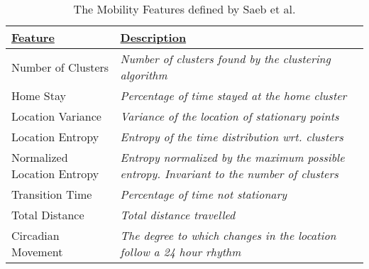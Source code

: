 \begin{table}[h]
    \centering
\begin{tabular}{|p{}|p{}|}
\hline
{\ul \textbf{Feature}}      & {\ul \textbf{Description}}                                                                                                                     \\ \hline
Number of Clusters          & \textit{Number of clusters found by the clustering algorithm}                                       \\ \hline
Home Stay                   & \textit{Percentage of time stayed at the home cluster}                                              \\ \hline
Location Variance           & \textit{Variance of the location of stationary points}                                              \\ \hline
Location Entropy            & \textit{Entropy of the time distribution wrt. clusters}                                             \\ \hline
Normalized Location Entropy & \textit{Entropy normalized by the maximum possible entropy. Invariant to the number of clusters} \\ \hline
Transition Time             & \textit{Percentage of time not stationary}                                                                                                  \\ \hline
Total Distance              & \textit{Total distance travelled}                                                                                                              \\ \hline
Circadian Movement          & \textit{The degree to which changes in the location follow a 24 hour rhythm}                        \\ \hline
\end{tabular}
    \caption{The Mobility Features defined by Saeb et al. \cite{Saeb2015}}
    \label{tab:saeb-features}
\end{table}